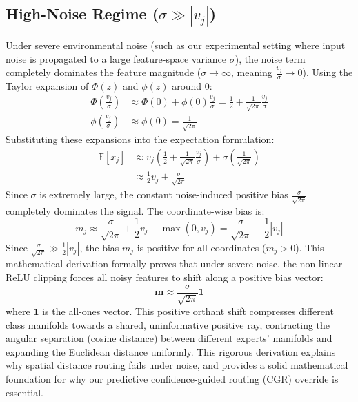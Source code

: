 \documentclass{article}
\theoremstyle{plain}
\theoremstyle{definition}
\theoremstyle{remark}
\begin{document}
\subsection{High-Noise Regime ($\sigma \gg |v_j|$)}
Under severe environmental noise (such as our experimental setting where input noise is propagated to a large feature-space variance $\sigma$), the noise term completely dominates the feature magnitude ($\sigma \to \infty$, meaning $\frac{v_j}{\sigma} \to 0$).
Using the Taylor expansion of $\Phi(z)$ and $\phi(z)$ around $0$:
\begin{align}
    \Phi\left(\frac{v_j}{\sigma}\right) &\approx \Phi(0) + \phi(0) \frac{v_j}{\sigma} = \frac{1}{2} + \frac{1}{\sqrt{2\pi}} \frac{v_j}{\sigma} \\
    \phi\left(\frac{v_j}{\sigma}\right) &\approx \phi(0) = \frac{1}{\sqrt{2\pi}}
\end{align}
Substituting these expansions into the expectation formulation:
\begin{align}
    \mathbb{E}[x_j] &\approx v_j \left( \frac{1}{2} + \frac{1}{\sqrt{2\pi}} \frac{v_j}{\sigma} \right) + \sigma \left( \frac{1}{\sqrt{2\pi}} \right) \nonumber \\
    &\approx \frac{1}{2} v_j + \frac{\sigma}{\sqrt{2\pi}}
\end{align}
Since $\sigma$ is extremely large, the constant noise-induced positive bias $\frac{\sigma}{\sqrt{2\pi}}$ completely dominates the signal. The coordinate-wise bias is:
\begin{equation}
    m_j \approx \frac{\sigma}{\sqrt{2\pi}} + \frac{1}{2} v_j - \max(0, v_j) = \frac{\sigma}{\sqrt{2\pi}} - \frac{1}{2} |v_j|
\end{equation}
Since $\frac{\sigma}{\sqrt{2\pi}} \gg \frac{1}{2} |v_j|$, the bias $m_j$ is positive for all coordinates ($m_j > 0$).
This mathematical derivation formally proves that under severe noise, the non-linear ReLU clipping forces all noisy features to shift along a positive bias vector:
\begin{equation}
    \mathbf{m} \approx \frac{\sigma}{\sqrt{2\pi}} \mathbf{1}
\end{equation}
where $\mathbf{1}$ is the all-ones vector. This positive orthant shift compresses different class manifolds towards a shared, uninformative positive ray, contracting the angular separation (cosine distance) between different experts' manifolds and expanding the Euclidean distance uniformly. This rigorous derivation explains why spatial distance routing fails under noise, and provides a solid mathematical foundation for why our predictive confidence-guided routing (CGR) override is essential.
\end{document}
